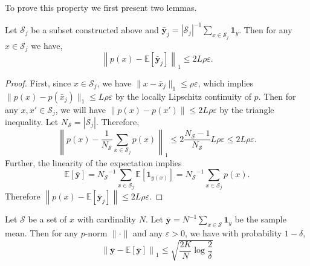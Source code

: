 To prove this property we first present two lemmas. 
\begin{lemma}
\label{lemma:Lipschitz-true-distribution}
Let $\mathcal{S}_j$ be a subset constructed above and $\mathbf{\bar{y}}_j = {|\mathcal{{S}}_j|}^{-1} \sum_{x\in \mathcal{{S}}_j} \mathbf{1}_{y}$. Then for any $x \in \mathcal{S}_j$ we have,
\begin{equation}
    \left\|p(x) - \mathbb{E}[\mathbf{\bar{y}}_j] \right\|_1 \le 2 L \rho\varepsilon.
\end{equation}
\end{lemma}
\begin{proof}
First, since $x \in \mathcal{S}_j$, we have $\|x - \bar{x}_j\|_1 \le \rho\varepsilon $, which implies $\|p(x) - p(\bar{x}_j)\|_1 \le L \rho\varepsilon$ by the locally Lipschitz continuity of $p$. Then for any $x, x' \in \mathcal{S}_j$, we will have $\|p(x) - p(x')\| \le 2L \rho\varepsilon$ by the triangle inequality. Let $N_{\mathcal{S}} = |\mathcal{S}_j|$. Therefore,
\begin{equation}
    \left\|p(x) - \frac{1}{N_{\mathcal{S}}} \sum_{x \in \mathcal{S}_j} p(x)\right\|_1 \le 2 \frac{N_{\mathcal{S}} - 1}{N_{\mathcal{S}}} L \rho\varepsilon \le 2 L \rho\varepsilon.
\end{equation}
Further, the linearity of the expectation implies
\begin{equation}
    \mathbb{E}[\mathbf{\bar{y}}] = {N_{\mathcal{S}}}^{-1} \sum_{x \in \mathcal{S}_j} \mathbb{E}[\mathbf{1}_{y(x)}] = {N_{\mathcal{S}}}^{-1} \sum_{x \in \mathcal{S}_j} p(x).
\end{equation}
Therefore $ \left\|p(x) - \mathbb{E}[\mathbf{\bar{y}}_j] \right\| \le 2 L \rho\varepsilon$.
\end{proof}


\begin{lemma}
\label{lemma:sample-mean}
Let $\mathcal{S}$ be a set of $x$ with cardinality $N$.
Let $\mathbf{\bar{y}} = N^{-1} \sum_{x\in \mathcal{S}} \mathbf{1}_y$ be the sample mean.
Then for any $p$-norm $\|\cdot\|$ and any $\varepsilon > 0$,  we have with probability $1 - \delta$,
\begin{equation}
    \label{eq:concentration-sample-mean}
    \left\| \mathbf{\bar{y}} - \mathbb{E}\left[ \mathbf{\bar{y}} \right] \right\|_1 \le \sqrt{\frac{2K}{N}\log \frac{2}{\delta}}
\end{equation}
\end{lemma}

